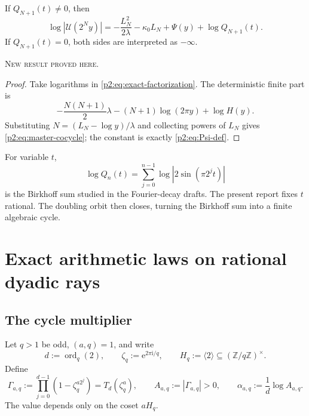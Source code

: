 \documentclass[11pt,oneside]{article}
\theoremstyle{definition}
\theoremstyle{remark}
\newcommand{\Z}{\mathbb Z}
\newcommand{\ord}{\operatorname{ord}}
\newcommand{\e}{\mathrm e}
\newcommand{\ii}{\mathrm i}
\newcommand{\newresult}{\textcolor{newgreen}{\textsc{New result proved here.}}}
\begin{document}
\begin{corollary}\label{p2:cor:master-cocycle}
If $Q_{N+1}(t)\ne0$, then
\begin{equation}
 \boxed{
 \log|\mathscr U(2^Ny)|
 =-\frac{L_N^2}{2\lambda}-\kappa_0L_N
 +\Psi(y)+\log Q_{N+1}(t).}
 \label{p2:eq:master-cocycle}
\end{equation}
If $Q_{N+1}(t)=0$, both sides are interpreted as $-\infty$.

\smallskip\noindent\newresult
\end{corollary}

\begin{proof}
Take logarithms in \eqref{p2:eq:exact-factorization}. The deterministic finite part is
\[
 -\frac{N(N+1)}2\lambda-(N+1)\log(2\pi y)+\log H(y).
\]
Substituting $N=(L_N-\log y)/\lambda$ and collecting powers of $L_N$ gives
\eqref{p2:eq:master-cocycle}; the constant is exactly \eqref{p2:eq:Psi-def}.
\end{proof}

\begin{remark}
For variable $t$,
\[
 \log Q_n(t)=\sum_{j=0}^{n-1}\log|2\sin(\pi2^jt)|
\]
is the Birkhoff sum studied in the Fourier-decay drafts. The present report fixes
$t$ rational. The doubling orbit then closes, turning the Birkhoff sum into a
finite algebraic cycle.
\end{remark}

\section{Exact arithmetic laws on rational dyadic rays}\label{p2:sec:rational-rays}

\subsection{The cycle multiplier}

Let $q>1$ be odd, $(a,q)=1$, and write
\begin{equation}
 d:=\ord_q(2),\qquad
 \zeta_q:=\e^{2\pi\ii/q},\qquad
 H_q:=\langle2\rangle\subseteq(\Z/q\Z)^\times.
 \label{p2:eq:q-d-H}
\end{equation}
Define
\begin{equation}
 \Gamma_{a,q}:=\prod_{j=0}^{d-1}(1-\zeta_q^{a2^j})=T_d(\zeta_q^a),
 \qquad A_{a,q}:=|\Gamma_{a,q}|>0,
 \qquad \alpha_{a,q}:=\frac1d\log A_{a,q}.
 \label{p2:eq:Gamma-A-alpha}
\end{equation}
The value depends only on the coset $aH_q$.
\end{document}
